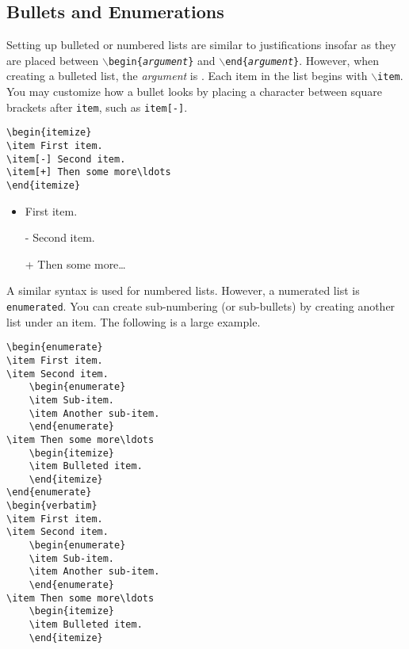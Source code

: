 \documentclass{article}
\begin{document}
\subsection{Bullets and Enumerations}

Setting up bulleted or numbered lists are similar to justifications insofar as they are placed between \texttt{$\backslash$begin\{\textit{argument}\}} and \texttt{$\backslash$end\{\textit{argument}\}}. However, when creating a bulleted list, the \textit{argument} is . Each item in the list begins with \texttt{$\backslash$item}. You may customize how a bullet looks by placing a character between square brackets after \texttt{item}, such as \texttt{item[-]}.
\begin{verbatim}
\begin{itemize}
\item First item.
\item[-] Second item.
\item[+] Then some more\ldots
\end{itemize}
\end{verbatim}
\begin{itemize}
\item First item.
\item[-] Second item.
\item[+] Then some more\ldots
\end{itemize}

A similar syntax is used for numbered lists. However, a numerated list is \texttt{enumerated}. You can create sub-numbering (or sub-bullets) by creating another list under an item. The following is a large example.
\begin{verbatim}
\begin{enumerate}
\item First item.
\item Second item.
	\begin{enumerate}
	\item Sub-item.
	\item Another sub-item.
	\end{enumerate}
\item Then some more\ldots
	\begin{itemize}
	\item Bulleted item.
	\end{itemize}
\end{enumerate}
\begin{verbatim}
\item First item.
\item Second item.
	\begin{enumerate}
	\item Sub-item.
	\item Another sub-item.
	\end{enumerate}
\item Then some more\ldots
	\begin{itemize}
	\item Bulleted item.
	\end{itemize}
\end{verbatim}
\end{document}
